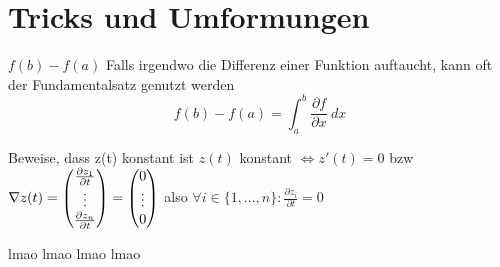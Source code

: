 \section{Tricks und Umformungen}
\begin{Rezept}{$f(b)-f(a)$}{}
Falls irgendwo die Differenz einer Funktion auftaucht, kann oft der Fundamentalsatz genutzt werden
\[ f(b)-f(a) = \int_a^b \frac{\partial f}{\partial x} ~ dx \]
\end{Rezept}

\begin{Rezept}{Beweise, dass z(t) konstant ist}{}
\centering
$z(t)$ konstant $\Longleftrightarrow z'(t) = 0$ bzw $\nabla z(t) = \begin{pmatrix} \frac{\partial z_1}{\partial t} \\ \vdots \\ \frac{\partial z_n}{\partial t} \end{pmatrix} = \begin{pmatrix} 0 \\ \vdots \\ 0 \end{pmatrix}$ also $\forall i \in \{1,\hdots,n\} :\frac{\partial z_i}{\partial t} = 0$
\end{Rezept}

\sadfaces

lmao lmao lmao lmao